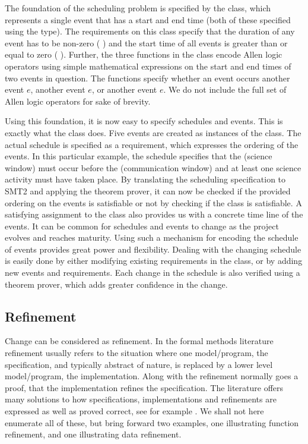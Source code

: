The foundation of the scheduling problem is specified by the
 class, which represents a single event that has a start
and end time (both of these specified using the  type). The
requirements on this class specify that the duration of any event has
to be non-zero ( ) and the start time
of all events is greater than or equal to zero (
). Further, the three functions in the 
class encode Allen logic operators \cite{allen-logic-84} 
using simple mathematical
expressions on the start and end times of two events in
question. The functions specify whether an event occurs
 another event $e$,  another event $e$, or
 another event $e$. We do not include the full set of
Allen logic operators for sake of brevity. 

Using this foundation, it is now easy to specify schedules and
events. This is exactly what the  class does. Five
events are created as instances of the  class. The actual
schedule is specified as a requirement, which expresses the ordering
of the events. In this particular example, the schedule specifies that
the  (science window) must occur before the
 (communication window) and at least one science
activity must have taken place. By translating the scheduling
specification to SMT2 and applying the \zthree{} theorem prover, it
can now be checked if the provided ordering on the events is
satisfiable or not by checking if the  class is
satisfiable. A satisfying assignment to the class also provides us
with a concrete time line of the events.  It can be common for
schedules and events to change as the project evolves and reaches
maturity. Using such a mechanism for encoding the schedule of events
provides great power and flexibility. Dealing with the changing
schedule is easily done by either modifying existing requirements 
in the  class, or by adding new events and
requirements. Each change in the schedule is also verified using a
theorem prover, which adds greater confidence in the change.


\subsection{Refinement}

Change can be considered as refinement. In the formal methods literature
refinement usually refers to the situation where one model/program, the 
specification, and typically abstract of nature, is replaced by a lower 
level model/program, the implementation. Along with the refinement normally
goes a proof, that the implementation refines the specification.
The literature offers many solutions to how specifications, implementations and 
refinements are expressed as well as proved correct, see for example 
\cite{vdm78,bjoerner-jones-82,jones90,raise92,george-raise-2008}. We shall not here enumerate all of these, but bring forward two examples, one illustrating function refinement, and one illustrating data refinement.

